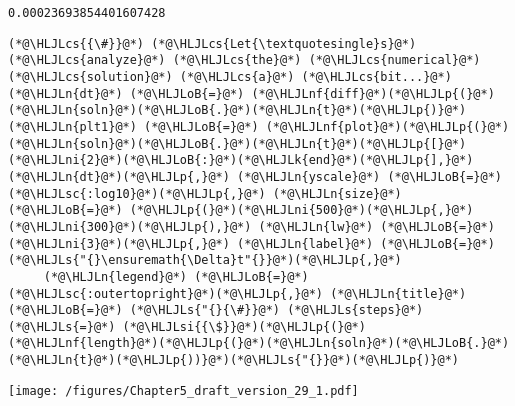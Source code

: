 \documentclass[12pt,a4paper]{article}
\newcommand{\HLJLk}[1]{\textcolor[RGB]{148,91,176}{\textbf{#1}}}
\newcommand{\HLJLn}[1]{#1}
\newcommand{\HLJLnf}[1]{\textcolor[RGB]{66,102,213}{#1}}
\newcommand{\HLJLs}[1]{\textcolor[RGB]{201,61,57}{#1}}
\newcommand{\HLJLsc}[1]{\textcolor[RGB]{201,61,57}{#1}}
\newcommand{\HLJLsi}[1]{#1}
\newcommand{\HLJLni}[1]{\textcolor[RGB]{59,151,46}{#1}}
\newcommand{\HLJLoB}[1]{\textcolor[RGB]{102,102,102}{\textbf{#1}}}
\newcommand{\HLJLp}[1]{#1}
\newcommand{\HLJLcs}[1]{\textcolor[RGB]{153,153,119}{\textit{#1}}}
\begin{document}
\begin{lstlisting}
0.00023693854401607428
\end{lstlisting}


\begin{lstlisting}
(*@\HLJLcs{{\#}}@*) (*@\HLJLcs{Let{\textquotesingle}s}@*) (*@\HLJLcs{analyze}@*) (*@\HLJLcs{the}@*) (*@\HLJLcs{numerical}@*) (*@\HLJLcs{solution}@*) (*@\HLJLcs{a}@*) (*@\HLJLcs{bit...}@*)
(*@\HLJLn{dt}@*) (*@\HLJLoB{=}@*) (*@\HLJLnf{diff}@*)(*@\HLJLp{(}@*)(*@\HLJLn{soln}@*)(*@\HLJLoB{.}@*)(*@\HLJLn{t}@*)(*@\HLJLp{)}@*)
(*@\HLJLn{plt1}@*) (*@\HLJLoB{=}@*) (*@\HLJLnf{plot}@*)(*@\HLJLp{(}@*)(*@\HLJLn{soln}@*)(*@\HLJLoB{.}@*)(*@\HLJLn{t}@*)(*@\HLJLp{[}@*)(*@\HLJLni{2}@*)(*@\HLJLoB{:}@*)(*@\HLJLk{end}@*)(*@\HLJLp{],}@*) (*@\HLJLn{dt}@*)(*@\HLJLp{,}@*) (*@\HLJLn{yscale}@*) (*@\HLJLoB{=}@*) (*@\HLJLsc{:log10}@*)(*@\HLJLp{,}@*) (*@\HLJLn{size}@*) (*@\HLJLoB{=}@*) (*@\HLJLp{(}@*)(*@\HLJLni{500}@*)(*@\HLJLp{,}@*) (*@\HLJLni{300}@*)(*@\HLJLp{),}@*) (*@\HLJLn{lw}@*) (*@\HLJLoB{=}@*) (*@\HLJLni{3}@*)(*@\HLJLp{,}@*) (*@\HLJLn{label}@*) (*@\HLJLoB{=}@*) (*@\HLJLs{"{}\ensuremath{\Delta}t"{}}@*)(*@\HLJLp{,}@*) 
     (*@\HLJLn{legend}@*) (*@\HLJLoB{=}@*) (*@\HLJLsc{:outertopright}@*)(*@\HLJLp{,}@*) (*@\HLJLn{title}@*) (*@\HLJLoB{=}@*) (*@\HLJLs{"{}{\#}}@*) (*@\HLJLs{steps}@*) (*@\HLJLs{=}@*) (*@\HLJLsi{{\$}}@*)(*@\HLJLp{(}@*)(*@\HLJLnf{length}@*)(*@\HLJLp{(}@*)(*@\HLJLn{soln}@*)(*@\HLJLoB{.}@*)(*@\HLJLn{t}@*)(*@\HLJLp{))}@*)(*@\HLJLs{"{}}@*)(*@\HLJLp{)}@*)
\end{lstlisting}

\texttt{[image: /figures/Chapter5\_draft\_version\_29\_1.pdf]}
\end{document}
